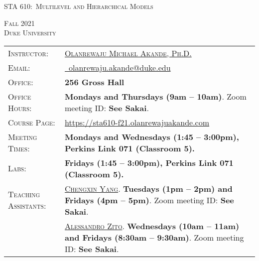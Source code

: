 \documentclass[11pt, a4paper]{article}
\begin{document}
\renewcommand{\arraystretch}{1.5}	


\begin{center}
{\Large \textsc{STA 610:\ Multilevel and Hierarchical Models}}
\end{center}


\begin{center}
	\textsc{Fall 2021} \\
	\textsc{Duke University} \\
\end{center}



\begin{center}
	\begin{minipage}[t]{.95\textwidth}
		\begin{tabular}{@{}L{3cm}L{12.5cm}}
			\toprule[0.065cm]
			\textsc{Instructor:} & \href{https://olanrewajuakande.com}{\textsc{Olanrewaju Michael Akande, Ph.D.}} \\
			\textsc{Email:} &\href{mailto:olanrewaju.akande@duke.edu}{\Envelope ~olanrewaju.akande@duke.edu} \\
			\textsc{Office:} & \textbf{256 Gross Hall} \\
			\textsc{Office Hours:} & \textbf{Mondays and Thursdays (9am -- 10am)}. \newline Zoom meeting ID: \textbf{See Sakai}. \\
			\textsc{Course Page:} & \href{https://sta610-f21.olanrewajuakande.com}{https://sta610-f21.olanrewajuakande.com} \\
			\textsc{Meeting Times:}  & \textbf{Mondays and Wednesdays (1:45 -- 3:00pm), Perkins Link 071 (Classroom 5).} \\
			\textsc{Labs:} & \textbf{Fridays (1:45 -- 3:00pm), Perkins Link 071 (Classroom 5).} \\
			\textsc{Teaching Assistants:} & \href{https://scholars.duke.edu/person/chengxin.yang}{\textsc{Chengxin Yang}}. 
							\newline \textbf{Tuesdays (1pm -- 2pm) and Fridays (4pm -- 5pm)}. \newline Zoom meeting ID: \textbf{See Sakai}.  \\
			&\href{https://scholars.duke.edu/person/alessandro.zito}{\textsc{Alessandro Zito}}. 
							\newline \textbf{Wednesdays (10am -- 11am) and Fridays (8:30am -- 9:30am)}. \newline Zoom meeting ID: \textbf{See Sakai}. \\

\end{tabular}
\end{minipage}
\end{center}
\end{document}
